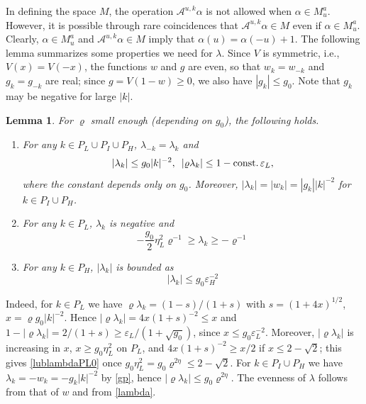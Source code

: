 \documentclass[11pt]{article}
\numberwithin{equation}{section}
\newcommand{\beq}{\begin{equation}}
\newcommand{\eeq}{\end{equation}}
\newcommand\eps{\varepsilon}
\newcommand\const{{\rm const.\, }}
\newcommand\al{{\alpha}}
\renewcommand\rho\varrho
\newtheorem{lem}{Lemma}[section]
\theoremstyle{definition}
\begin{document}
In defining the space $M$,   the operation $ \mathcal A^{u, k}\al $  is not allowed when  $\al\in M_u^a$.  However, it is possible through rare coincidences  that  $ \mathcal A^{u, k}\al \in M$ even if $\al\in M_u^a$.  Clearly,   $\al\in M_u^a$ and $ \mathcal A^{u, k}\al  \in M $ imply that $\alpha(u)  = \alpha(-u) + 1$. 
The following lemma summarizes some properties we need for $\lambda$. Since $V$ is symmetric, i.e., $V(x)=V(-x)$, the functions $w$ and $g$ are even, so that $w_k=w_{-k}$ and $g_k=g_{-k}$ are real; since $g=V(1-w)\geq 0$, we also have $|g_k|\leq g_0$. Note that $g_k$ may be negative for large $|k|$.
\begin{lem}\label{lem-l}
For $\rho$ small enough (depending on $g_0$), the following holds.
\begin{enumerate}
	\item For any $k\in P_L\cup P_I\cup P_H$, $\lambda_{-k}=\lambda_k$ and
	\beq\label{ublambda}
	|\lambda_k|\leq g_0|k|^{-2}, \,\,\, |\rho\lambda_k|\leq 1-\const\eps_L ,
	 \eeq
	 where the constant depends only on $g_0$. Moreover, $|\lambda_k|=|w_k|=|g_k||k|^{-2}$ for $k\in P_I\cup P_H$.
	 \item For any $k\in P_L$, $\lambda_k$ is negative and
	 \beq\label{lublambdaPL0}
	 -\frac{g_0}{2}\eta_L^2\rho^{-1}\geq \lambda_k\geq-\rho^{-1}
	 \eeq
	 \item For any $k\in P_H$, $|\lambda_k|$ is bounded as
	 \beq\label{ublambdaPH0}
	|\lambda_k|\leq g_0\eps_H^{-2}
	 \eeq
\end{enumerate}
\end{lem}
Indeed, for $k\in P_L$ we have $\rho\lambda_k=(1-s)/(1+s)$ with $s=(1+4x)^{1/2}$, $x=\rho g_0|k|^{-2}$. Hence $|\rho\lambda_k|=4x(1+s)^{-2}\leq x$ and $1-|\rho\lambda_k|=2/(1+s)\geq \eps_L/(1+\sqrt{g_0})$, since $x\le g_0\eps_L^{-2}$. Moreover, $|\rho\lambda_k|$ is increasing in $x$, $x\geq g_0\eta_L^2$ on $P_L$, and $4x(1+s)^{-2}\geq x/2$ if $x\leq 2-\sqrt2$; this gives \eqref{lublambdaPL0} once $g_0\eta_L^2=g_0\rho^{2\eta}\leq 2-\sqrt 2$. For $k\in P_I\cup P_H$ we have $\lambda_k=-w_k=-g_k|k|^{-2}$ by \eqref{gp}, hence $|\rho\lambda_k|\leq g_0\rho^{2\eta}$. The evenness of $\lambda$ follows from that of $w$ and from \eqref{lambda}.
\end{document}
